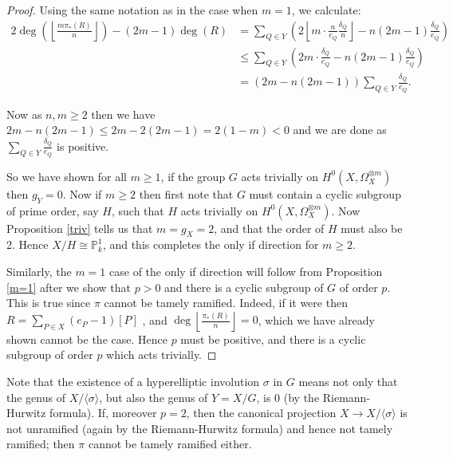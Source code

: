 \begin{proof}
    Using the same notation as in the case when $m=1$, we calculate:
        \begin{align*}
        2\deg\left(\left\lfloor\frac{m\pi_*(R)}{n}\right\rfloor\right)-(2m-1)\deg(R) & = \sum_{Q \in Y} \left(2\left\lfloor m\cdot \frac{n}{e_Q}\frac{\delta_Q}{n}\right\rfloor -n(2m-1)\frac{\delta_Q}{e_Q}\right) \\
        & \leq   \sum_{Q\in Y}\left( 2m\cdot\frac{\delta_Q}{e_Q}-n(2m-1)\frac{\delta_Q}{e_Q}\right) \\
        & =  (2m-n(2m-1))\sum_{Q\in Y }\frac{\delta_Q}{e_Q}.
        \end{align*}
    
    Now as $n,m\geq 2$ then we have $2m-n(2m-1)\leq 2m-2(2m-1)=2(1-m)<0$ and we are done as $\sum_{Q\in Y}\frac{\delta_Q}{e_Q}$ is positive.
    
    So we have shown for all $m\geq 1$, if the group $G$ acts trivially  on $H^0(X,\Omega_X^{\otimes m})$ then $g_Y=0$.
    Now if $m\geq 2$ then first note that $G$ must contain a cyclic subgroup of prime order, say $H$, such that $H$ acts trivially on $H^0(X,\Omega_X^{\otimes m})$.
    Now Proposition \ref{triv} tells us that $m=g_X=2$, and that the order of $H$ must also be 2.
    Hence $X/H\cong \mathbb{P}_k^1$, and this completes the only if direction for $m\geq 2$.
    
    Similarly, the $m=1$ case of the only if direction will follow from Proposition \ref{m=1} after we show that $p>0$ and there is a cyclic subgroup of $G$ of order $p$. 
    This is true since $\pi$ cannot be tamely ramified.
    Indeed, if it were then $R=\sum_{P\in X} (e_P-1)[P]$ \cite[Chap. IV, Cor. 2.4]{hart}, and $\deg\left\lfloor \frac{\pi_*(R)}{n} \right\rfloor=0$, which we have already shown cannot be the case.
    Hence $p$ must be positive, and there is a cyclic subgroup of order $p$ which acts trivially.
    \end{proof}

    \begin{rem}
    Note that the existence of a hyperelliptic involution $\sigma$ in $G$ means not only that the genus of $X/\langle \sigma \rangle$, but also the genus of $Y=X/G$, is $0$ (by the Riemann-Hurwitz formula).
    If, moreover $p=2$, then the canonical projection $X\rightarrow X/\langle \sigma \rangle$ is not unramified (again by the Riemann-Hurwitz formula) and hence not tamely ramified; then $\pi$ cannot be tamely ramified either.
    \end{rem}


